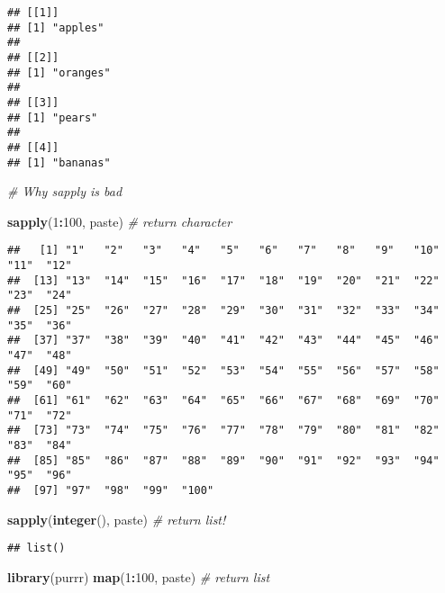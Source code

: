 \documentclass[
]{book}
\newenvironment{Shaded}{\begin{snugshade}}{\end{snugshade}}
\newcommand{\CommentTok}[1]{\textcolor[rgb]{0.56,0.35,0.01}{\textit{#1}}}
\newcommand{\DecValTok}[1]{\textcolor[rgb]{0.00,0.00,0.81}{#1}}
\newcommand{\KeywordTok}[1]{\textcolor[rgb]{0.13,0.29,0.53}{\textbf{#1}}}
\newcommand{\NormalTok}[1]{#1}
\newcommand{\OperatorTok}[1]{\textcolor[rgb]{0.81,0.36,0.00}{\textbf{#1}}}
\begin{document}
\begin{verbatim}
## [[1]]
## [1] "apples"
## 
## [[2]]
## [1] "oranges"
## 
## [[3]]
## [1] "pears"
## 
## [[4]]
## [1] "bananas"
\end{verbatim}

\begin{Shaded}
\begin{Highlighting}[]
\CommentTok{\# Why sapply is bad }

\KeywordTok{sapply}\NormalTok{(}\DecValTok{1}\OperatorTok{:}\DecValTok{100}\NormalTok{, paste) }\CommentTok{\# return character }
\end{Highlighting}
\end{Shaded}

\begin{verbatim}
##   [1] "1"   "2"   "3"   "4"   "5"   "6"   "7"   "8"   "9"   "10"  "11"  "12" 
##  [13] "13"  "14"  "15"  "16"  "17"  "18"  "19"  "20"  "21"  "22"  "23"  "24" 
##  [25] "25"  "26"  "27"  "28"  "29"  "30"  "31"  "32"  "33"  "34"  "35"  "36" 
##  [37] "37"  "38"  "39"  "40"  "41"  "42"  "43"  "44"  "45"  "46"  "47"  "48" 
##  [49] "49"  "50"  "51"  "52"  "53"  "54"  "55"  "56"  "57"  "58"  "59"  "60" 
##  [61] "61"  "62"  "63"  "64"  "65"  "66"  "67"  "68"  "69"  "70"  "71"  "72" 
##  [73] "73"  "74"  "75"  "76"  "77"  "78"  "79"  "80"  "81"  "82"  "83"  "84" 
##  [85] "85"  "86"  "87"  "88"  "89"  "90"  "91"  "92"  "93"  "94"  "95"  "96" 
##  [97] "97"  "98"  "99"  "100"
\end{verbatim}

\begin{Shaded}
\begin{Highlighting}[]
\KeywordTok{sapply}\NormalTok{(}\KeywordTok{integer}\NormalTok{(), paste) }\CommentTok{\# return list!}
\end{Highlighting}
\end{Shaded}

\begin{verbatim}
## list()
\end{verbatim}

\begin{Shaded}
\begin{Highlighting}[]
\KeywordTok{library}\NormalTok{(purrr)}
\KeywordTok{map}\NormalTok{(}\DecValTok{1}\OperatorTok{:}\DecValTok{100}\NormalTok{, paste) }\CommentTok{\# return list}
\end{Highlighting}
\end{Shaded}
\end{document}
